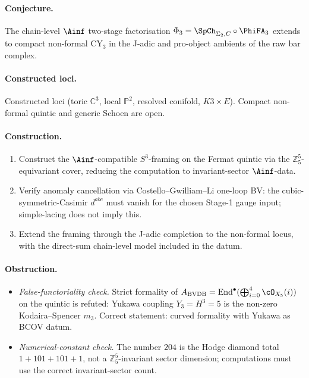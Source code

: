 \paragraph{Conjecture.} The chain-level $\Ainf$
two-stage factorisation
$\Phi_3 = \SpCh_{\Sigma_2, C} \circ \PhiFA_3$ extends to compact
non-formal CY$_3$ in the J-adic and pro-object ambients of the raw
bar complex.

\paragraph{Constructed loci.} Constructed loci (toric $\mathbb{C}^3$, local
$\mathbb{P}^2$, resolved conifold, $K3 \times E$). Compact non-formal
quintic and generic Schoen are open.

\paragraph{Construction.}
\begin{enumerate}[nosep]
\item Construct the $\Ainf$-compatible $S^3$-framing on the Fermat
  quintic via the $\mathbb{Z}_5^5$-equivariant cover, reducing the
  computation to invariant-sector $\Ainf$-data.
\item Verify anomaly cancellation via Costello--Gwilliam--Li one-loop
  BV: the cubic-symmetric-Casimir $d^{abc}$ must vanish for the
  chosen Stage-1 gauge input; simple-lacing does not imply this.
\item Extend the framing through the J-adic completion to the
  non-formal locus, with the direct-sum chain-level model included in
  the datum.
\end{enumerate}

\paragraph{Obstruction.}
\begin{itemize}[nosep]
\item \emph{False-functoriality check.} Strict formality of
  $A_{\mathrm{BVDB}} = \mathrm{End}^\bullet(\bigoplus_{i=0}^4 \cO_{X_5}(i))$
  on the quintic is refuted: Yukawa coupling $Y_3 = H^3 = 5$ is the
  non-zero Kodaira--Spencer $m_3$. Correct statement: curved
  formality with Yukawa as BCOV datum.
\item \emph{Numerical-constant check.} The number $204$ is the Hodge
  diamond total $1 + 101 + 101 + 1$, not a $\mathbb{Z}_5^5$-invariant
  sector dimension; computations must use the correct invariant-sector
  count.
\end{itemize}

